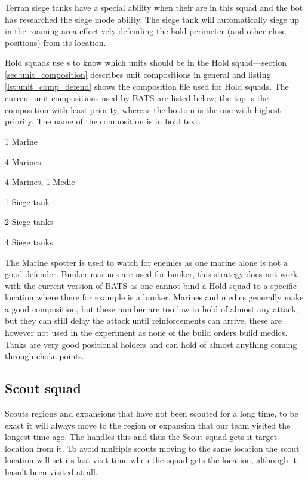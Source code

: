 Terran siege tanks have a special ability when their are in this squad and the bot has researched
the siege mode ability. The siege tank will automatically siege up in the roaming area effectively
defending the hold perimeter (and other close positions) from its location.

Hold squads use s to know which units should be in the Hold
squad—section \ref{sec:unit_composition} describes unit compositions in general and listing
\ref{lst:unit_comp_defend} shows the composition file used for Hold squads. The current unit
compositions used by BATS are listed below; the top is the composition with least priority, whereas
the bottom is the one with highest priority. The name of the composition is in bold text.

\begin{function_description}
	\item[Marine spotter] 1 Marine
	\item[Bunker Marines] 4 Marines
	\item[Marine Medics] 4 Marines, 1 Medic
	\item[Tanks 1] 1 Siege tank
	\item[Tanks 2] 2 Siege tanks
	\item[Tanks 4] 4 Siege tanks
\end{function_description}
The Marine spotter is used to watch for enemies as one marine alone is not a good defender. Bunker
marines are used for bunker, this strategy does not work with the current version of BATS as one
cannot bind a Hold squad to a specific location where there for example is a bunker. Marines and
medics generally make a good composition, but these number are too low to hold of almost any attack,
but they can still delay the attack until reinforcements can arrive, these are however not used in
the experiment as none of the build orders build medics. Tanks are very good positional holders and
can hold of almost anything coming through choke points\cite{day9}.

\subsection{Scout squad}
\label{sec:scout_squad}
Scouts regions and expansions that have not been scouted for a long time, to be exact it will always
move to the region or expansion that our team visited the longest time ago. The
 handles this and thus the Scout squad gets it target location from
it. To avoid multiple scouts moving to the same location the scout location will set its last visit
time when the squad gets the location, although it hasn't been visited at all.

